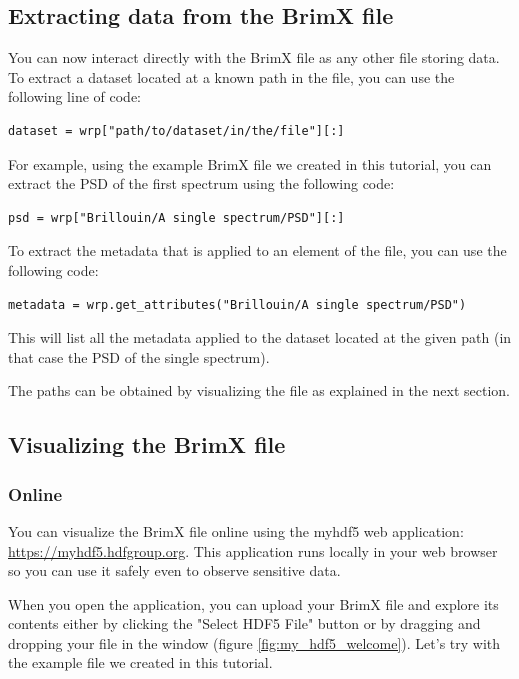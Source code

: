 \documentclass{article}
\begin{document}
\subsection{Extracting data from the BrimX file}

You can now interact directly with the BrimX file as any other file storing data. To extract a dataset located at a known path in the file, you can use the following line of code:
\begin{lstlisting}
dataset = wrp["path/to/dataset/in/the/file"][:]
\end{lstlisting}

For example, using the example BrimX file we created in this tutorial, you can extract the PSD of the first spectrum using the following code:
\begin{lstlisting}
psd = wrp["Brillouin/A single spectrum/PSD"][:]
\end{lstlisting}

To extract the metadata that is applied to an element of the file, you can use the following code:
\begin{lstlisting}
metadata = wrp.get_attributes("Brillouin/A single spectrum/PSD")
\end{lstlisting}
This will list all the metadata applied to the dataset located at the given path (in that case the PSD of the single spectrum).

The paths can be obtained by visualizing the file as explained in the next section.

\subsection{Visualizing the BrimX file}

\subsubsection{Online}

You can visualize the BrimX file online using the myhdf5 web application: \url{https://myhdf5.hdfgroup.org}. This application runs locally in your web browser so you can use it safely even to observe sensitive data.

When you open the application, you can upload your BrimX file and explore its contents either by clicking the "Select HDF5 File" button or by dragging and dropping your file in the window (figure \ref{fig:my_hdf5_welcome}). Let's try with the example file we created in this tutorial.
\end{document}
